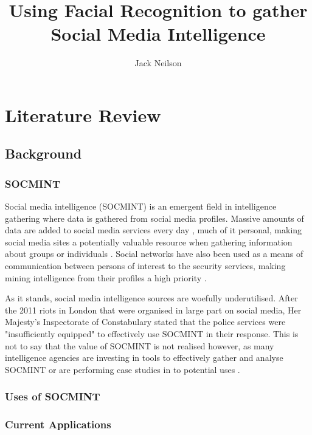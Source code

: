 \documentclass{article}
\begin{document}
\title{Using Facial Recognition to gather Social Media Intelligence}
\author{Jack Neilson}
\maketitle
\newpage
\section{Literature Review}
\subsection{Background}
\subsubsection{SOCMINT}
Social media intelligence (SOCMINT) is an emergent field in intelligence gathering where data is gathered from social media profiles. Massive amounts of data are added to social media services every day \citep{socmintoverview}, much of it personal, making social media sites a potentially valuable resource when gathering information about groups or individuals \citep{gchqmasssurveillance}. Social networks have also been used as a means of communication between persons of interest to the security services, making mining intelligence from their profiles a high priority \citep{socmintoverview}\citep{policesocmint}.

As it stands, social media intelligence sources are woefully underutilised. After the 2011 riots in London that were organised in large part on social media, Her Majesty's Inspectorate of Constabulary stated that the police services were "insufficiently equipped" to effectively use SOCMINT in their response\citep{socmintpublicsafety}. This is not to say that the value of SOCMINT is not realised however, as many intelligence agencies are investing in tools to effectively gather and analyse SOCMINT \citep{socmintpublicsafety} or are performing case studies in to potential uses \citep{bostonbombingcasestudy}.



\subsubsection{Uses of SOCMINT}

\subsubsection{Current Applications}
\end{document}
